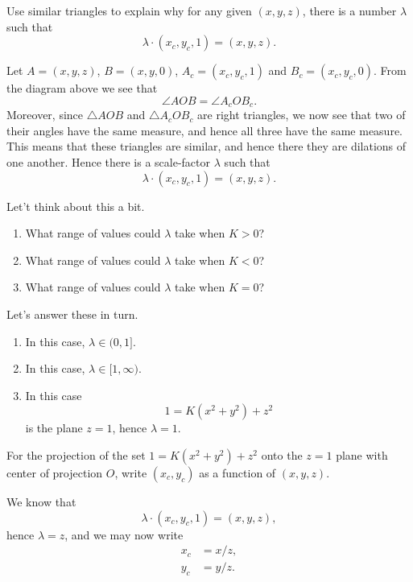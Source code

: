 \documentclass[newpage,hints,handout,12pt,noauthor,nooutcomes]{ximera}
\begin{document}
\begin{problem}
  Use similar triangles to explain why for any given $(x,y,z)$, there
  is a number $\lambda$ such that
  \[
  \lambda\cdot(x_c,y_c,1) = (x,y,z).
  \]
  \begin{freeResponse}
    Let $A = (x,y,z)$, $B= (x,y,0)$, $A_c = (x_c,y_c,1)$ and
    $B_c=(x_c,y_c,0)$. From the diagram above we see that
    \[
    \angle AOB = \angle A_c O B_c.
    \]
    Moreover, since $\triangle AOB$ and $\triangle A_c O B_c$ are
    right triangles, we now see that two of their angles have the same
    measure, and hence all three have the same measure. This means
    that these triangles are similar, and hence there they are
    dilations of one another. Hence there is a scale-factor $\lambda$
    such that
    \[
    \lambda\cdot(x_c,y_c,1) = (x,y,z).
    \]
  \end{freeResponse}
\end{problem}


\begin{problem}
  Let't think about this a bit.
  \begin{enumerate}
  \item What range of values could $\lambda$ take when $K>0$?
  \item What range of values could $\lambda$ take when $K<0$?
  \item What range of values could $\lambda$ take when $K=0$?
  \end{enumerate}
  \begin{freeResponse}
    Let's answer these in turn.
    \begin{enumerate}
    \item In this case, $\lambda\in (0,1]$.
    \item In this case, $\lambda\in[1,\infty)$.
    \item In this case
    \[
    1=K\left(x^{2}+y^{2}\right)+z^{2} 
    \]
    is the plane $z = 1$, hence $\lambda=1$.
    \end{enumerate}
  \end{freeResponse}
\end{problem}



\begin{problem}
  For the projection of the set $1=K\left(x^{2}+y^{2}\right)+z^{2}$
  onto the $z=1$ plane with center of projection $O$, write
  $(x_{c},y_{c})$ as a function of $(x,y,z)$.
  \begin{freeResponse}
    We know that
    \[
    \lambda\cdot(x_{c},y_{c},1)=(x,y,z),
    \]
    hence $\lambda=z$, and we may now write
    \begin{align*}
      x_{c} &=x/z,\\
      y_{c} &=y/z.
    \end{align*}
  \end{freeResponse}
\end{problem}
\end{document}
